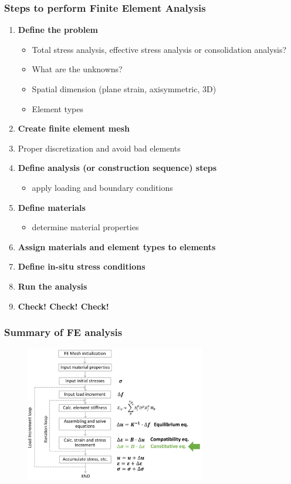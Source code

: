 \documentclass[notes]{beamer}
\begin{document}
\begin{frame}
\frametitle{Steps to perform Finite Element Analysis}
\begin{enumerate}
	\item \textbf{Define the problem}
	\begin{itemize}
		\item Total stress analysis, effective stress analysis or consolidation
		analysis?
		\item What are the unknowns?
		\item Spatial dimension (plane strain, axisymmetric, 3D)
		\item Element types
	\end{itemize}	
	\item \textbf{Create finite element mesh}
	\item Proper discretization and avoid bad elements
	\item \textbf{Define analysis (or construction sequence) steps}
	\begin{itemize}
		\item apply loading and boundary conditions
	\end{itemize}
	\item \textbf{Define materials}
	\begin{itemize}
		\item determine material properties
	\end{itemize}
	\item \textbf{Assign materials and element types to elements} 
	\item \textbf{Define in-situ stress conditions}
	\item \textbf{Run the analysis}
	\item \textbf{Check! Check! Check!}
\end{enumerate}
\end{frame}


\begin{frame}
	\frametitle{Summary of FE analysis}
	\begin{figure}[ht]
		\centering
		\includegraphics[width=0.7\textwidth]{figs/fe-code.png}
	\end{figure}
\end{frame}
\end{document}
